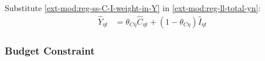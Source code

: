 \documentclass[../thesis.tex]{subfiles}
\begin{document}
Substitute \ref{ext-mod:reg-ss-C-I-weight-in-Y} in \ref{ext-mod:reg-ll-total-yn}:
\begin{align}
	\hat{Y}_{\eta t} &= \theta_{C\eta} \hat{C}_{\eta t} + (1 - \theta_{C\eta}) \hat{I}_{\eta t} \label{ext-mod:reg-ll-total-yn-2}
\end{align}

\begin{comment}
	Log-linearize \ref{ext-mod:reg-regional-demand} and then substitute \ref{ext-mod:reg-total-expense-level-2-ll}:
	\begin{align}
		P_{\eta t} Y_{\eta t} &= Q_{\eta t} C_{\eta t} + B_{\eta t} \tag{\ref{ext-mod:reg-regional-demand}} \implies \\
		\hat{P}_{\eta t} + \hat{Y}_{\eta t} &= \frac{Q_{\eta} C_{\eta}}{P_{\eta} Y_{\eta}} (\hat{Q}_{1t} + \hat{C}_{\eta t}) + \frac{B_{\eta}}{P_{\eta} Y_{\eta}} \hat{B}_{\eta t} \label{ext-mod:reg-regional-demand-ll}
	\end{align}
	
	
	Define bond and consumption weights on total expenses as $\langle \begin{matrix} \theta_{B \eta} & (1-\theta_{B \eta}) \end{matrix} \rangle$:
	\begin{align}
		\left\langle \begin{matrix} \theta_{B \eta} & (1-\theta_{B \eta}) \end{matrix} \right\rangle \coloneq \left\langle \begin{matrix} \frac{B_{\eta}}{P_{\eta} Y_{\eta}} & \frac{Q_{\eta} C_{\eta}}{P_{\eta} Y_{\eta}} \end{matrix} \right\rangle \label{ext-mod:reg-ss-Q-weight-in-Y} \end{align}
	
	
	Substitute \ref{ext-mod:reg-ss-Q-weight-in-Y} in \ref{ext-mod:reg-regional-demand-ll}:
	\begin{align}
		\hat{P}_{\eta t} + \hat{Y}_{\eta t} &= \theta_{B\eta} (\hat{Q}_{1t} + \hat{C}_{\eta t}) + (1-\theta_{B\eta}) \hat{B}_{\eta t} \label{ext-mod:reg-regional-demand-ll-2}
	\end{align}
\end{comment}


\subsubsection*{Budget Constraint}
\end{document}
